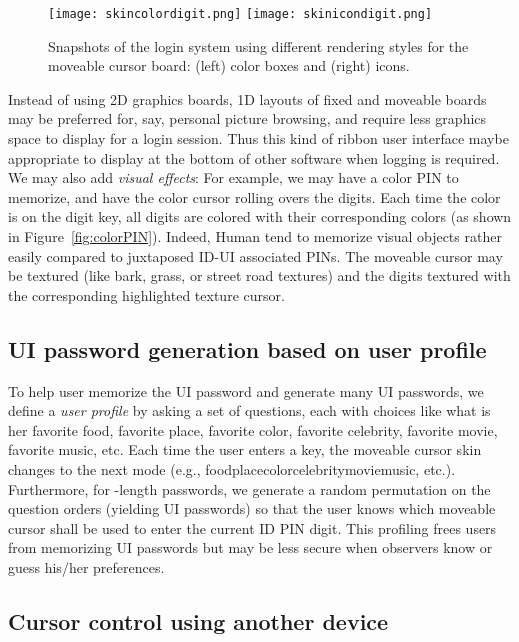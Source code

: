 \documentclass[12pt,onecolumn]{article}
\begin{document}
\begin{figure}
\centering
 \texttt{[image: skincolordigit.png]}  
 \texttt{[image: skinicondigit.png]} 
\caption{
Snapshots of the login system using different rendering styles for the moveable cursor board: (left) color boxes and (right) icons. 
\label{fig:skins}}
\end{figure} 


Instead of using 2D graphics boards, 1D layouts of fixed and moveable boards may be preferred for, say, personal picture browsing, and require less graphics space to display for a login session.
Thus this kind of ribbon user interface maybe appropriate to display at the bottom of other software when logging is required.
We may also add {\em visual effects}: For example, we may have a color PIN to memorize, and have the color cursor rolling overs the digits.
Each time the color is on the digit key, all digits are colored with their corresponding colors (as shown in Figure~\ref{fig:colorPIN}). 
Indeed, Human tend to memorize visual objects rather easily compared to juxtaposed ID-UI associated PINs.
The moveable cursor may be textured (like bark, grass, or street road textures) and the digits textured with the corresponding highlighted texture cursor.
 


\subsection{UI password generation based on user profile\label{sec:userprofile}}

To help user memorize the UI password and generate many UI passwords, we define a {\em user profile} by asking a set of  questions, each with  choices like what is her favorite food, favorite place, favorite color, favorite celebrity, favorite movie, favorite music, etc.
Each time the user enters a key, the moveable cursor skin changes to the next mode (e.g., foodplacecolorcelebritymoviemusic, etc.).
Furthermore, for -length passwords, we generate a random permutation on the question orders (yielding  UI passwords) so that the user knows which moveable cursor shall be used to enter the current ID PIN digit.
This profiling frees users from memorizing   UI passwords but may be less secure when observers know or guess his/her preferences.
 


\subsection{Cursor control using another device}
\end{document}

